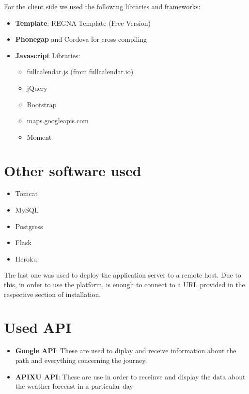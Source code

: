 \documentclass[numbers=noenddot, 12pt, a4paper, oneside]{scrbook}
\begin{document}
For the client side we used the following libraries and frameworks:
\begin{itemize}
	\item \textbf{Template}: REGNA Template (Free Version)
	\item \textbf{Phonegap} and Cordova for cross-compiling
	\item \textbf{Javascript} Libraries:
	\begin{itemize}
		\item fullcalendar.js (from fullcalendar.io)
		\item jQuery
		\item Bootstrap
		\item maps.googleapis.com
		\item Moment
	\end{itemize}	
\end{itemize}

\section*{Other software used}

\begin{itemize}
	\item Tomcat
	\item MySQL
	\item Postgress
	\item Flask
	\item Heroku
\end{itemize}

The last one was used to deploy the application server to a remote host. Due to this, in order to use the platform, is enough to connect to a URL provided in the respective section of installation. 

\section*{Used API}

\begin{itemize}
	\item \textbf{Google API}: These are used to diplay and receive information about the path and everything concerning the journey.
	
	\item \textbf{APIXU API}: These are use in order to receinve and display the data about the weather forecast in a particular day
\end{itemize}
\end{document}
